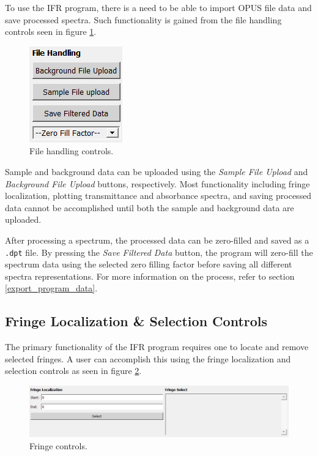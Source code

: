 \documentclass[a4paper, 12pt]{report}
\begin{document}
    To use the IFR program, there is a need to be able to import OPUS file data and save processed spectra. Such functionality is gained from the file handling controls seen in figure \ref{fig:3}.
    
    \begin{figure}[h]
        \centering
        \includegraphics{figures/file_handling.png}
        \caption{File handling controls.}
        \label{fig:3}
    \end{figure}
    
    Sample and background data can be uploaded using the \textit{Sample File Upload} and \textit{Background File Upload} buttons, respectively. Most functionality including fringe localization, plotting transmittance and absorbance spectra, and saving processed data cannot be accomplished until both the sample and background data are uploaded.
    
    After processing a spectrum, the processed data can be zero-filled and saved as a \verb|.dpt| file. By pressing the \textit{Save Filtered Data} button, the program will zero-fill the spectrum data using the selected zero filling factor before saving all different spectra representations. For more information on the process, refer to section \ref{export_program_data}.

    \subsection{Fringe Localization \& Selection Controls}
    
    The primary functionality of the IFR program requires one to locate and remove selected fringes. A user can accomplish this using the fringe localization and selection controls as seen in figure \ref{fig:4}.
    
    \begin{figure}[h]
        \centering
        \includegraphics[width=\textwidth]{figures/fringe_controls.png}
        \caption{Fringe controls.}
        \label{fig:4}
    \end{figure}
    
\end{document}
